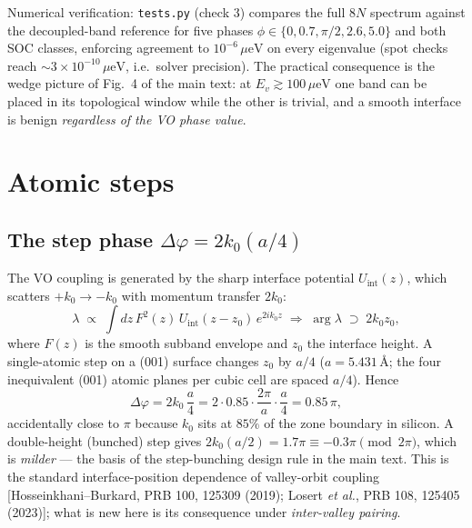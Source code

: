 \documentclass[11pt]{article}
\newcommand{\ueV}{\,\mu\mathrm{eV}}
\begin{document}
Numerical verification: \texttt{tests.py} (check 3) compares the full $8N$
spectrum against the decoupled-band reference for five phases
$\phi \in \{0, 0.7, \pi/2, 2.6, 5.0\}$ and both SOC classes, enforcing
agreement to $10^{-6}\ueV$ on every eigenvalue (spot checks reach
$\sim 3\times10^{-10}\ueV$, i.e.\ solver precision).
The practical consequence is the wedge picture of Fig.~4 of the main text:
at $E_v \gtrsim 100\ueV$ one band can be placed in its topological window
while the other is trivial, and a smooth interface is benign
\emph{regardless of the VO phase value}.

\section{Atomic steps}\label{s:step}
\subsection{The step phase $\Delta\varphi = 2k_0(a/4)$}
The VO coupling is generated by the sharp interface potential
$U_{\mathrm{int}}(z)$, which scatters $+k_0 \to -k_0$ with momentum transfer
$2k_0$:
\begin{equation}
\lambda \;\propto\; \int dz\, F^2(z)\, U_{\mathrm{int}}(z - z_0)\,
e^{2ik_0 z}\;\Longrightarrow\; \arg\lambda \;\supset\; 2k_0 z_0 ,
\end{equation}
where $F(z)$ is the smooth subband envelope and $z_0$ the interface height.
A single-atomic step on a (001) surface changes $z_0$ by $a/4$
($a = 5.431$\,\AA{}; the four inequivalent (001) atomic planes per cubic
cell are spaced $a/4$). Hence
\begin{equation}
\Delta\varphi = 2k_0\,\frac{a}{4} = 2\cdot 0.85\cdot\frac{2\pi}{a}\cdot
\frac{a}{4} = 0.85\,\pi ,
\end{equation}
accidentally close to $\pi$ because $k_0$ sits at $85\%$ of the zone
boundary in silicon. A double-height (bunched) step gives
$2k_0(a/2) = 1.7\pi \equiv -0.3\pi \pmod{2\pi}$, which is \emph{milder}
--- the basis of the step-bunching design rule in the main text. This is the
standard interface-position dependence of valley-orbit coupling
[Hosseinkhani--Burkard, PRB 100, 125309 (2019); Losert \emph{et al.}, PRB
108, 125405 (2023)]; what is new here is its consequence under
\emph{inter-valley pairing}.
\end{document}
